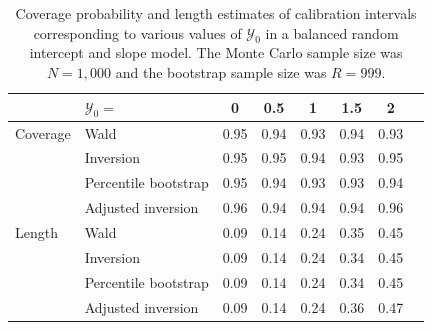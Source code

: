 \documentclass[cmfont,usenames,dvipsnames,leqno]{afit-etd}\usepackage[]{graphicx}\usepackage[]{color}
\newcommand{\mc}[1]{\ensuremath{\mathcal{#1}}}
\begin{document}
\begin{table}[!htb]
\centering
\caption[Coverage probability and length estimates for balanced random intercept and slope model]{Coverage probability and length estimates of calibration intervals corresponding to various values of $\mc{Y}_0$ in a balanced random intercept and slope model. The Monte Carlo sample size was $N = 1,000$ and the bootstrap sample size was $R = 999$. \label{tab:linear-results}}
\begin{tabular}{llcccccc}
  \toprule
            &  $\mathcal{Y}_0 =$ & 0    & 0.5  & 1    & 1.5  & 2    \\
  \hline
  Coverage  &  Wald                 & 0.95 & 0.94 & 0.93 & 0.94 & 0.93 \\
            &  Inversion            & 0.95 & 0.95 & 0.94 & 0.93 & 0.95 \\
            &  Percentile bootstrap & 0.95 & 0.94 & 0.93 & 0.93 & 0.94 \\
  					&  Adjusted inversion   & 0.96 & 0.94 & 0.94 & 0.94 & 0.96 \\
  \hline
  Length    &  Wald                 & 0.09 & 0.14 & 0.24 & 0.35 & 0.45 \\
            &  Inversion            & 0.09 & 0.14 & 0.24 & 0.34 & 0.45 \\
            &  Percentile bootstrap & 0.09 & 0.14 & 0.24 & 0.34 & 0.45 \\
						&  Adjusted inversion   & 0.09 & 0.14 & 0.24 & 0.36 & 0.47 \\
  \bottomrule
\end{tabular}
\end{table}
\end{document}
